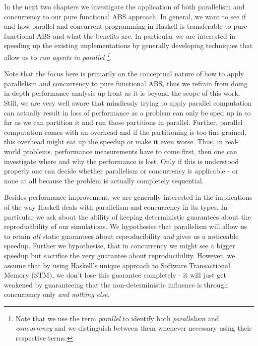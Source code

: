 In the next two chapters we investigate the application of both parallelism and concurrency to our pure functional ABS approach. In general, we want to see if and how parallel and concurrent programming in Haskell is transferable to pure functional ABS and what the benefits are. In particular we are interested in speeding up the existing implementations by generally developing techniques that allow us to  \textit{run agents in parallel \footnote{Note that we use the term \textit{parallel} to identify both \textit{parallelism} and \textit{concurrency} and we distinguish between them whenever necessary using their respective terms.}}. 

Note that the focus here is primarily on the conceptual nature of how to apply parallelism and concurrency to pure functional ABS, thus we refrain from doing in-depth performance analysis up-front as it is beyond the scope of this work. Still, we are very well aware that mindlessly trying to apply parallel computation can actually result in loss of performance as a problem can only be sped up in so far as we can partition it and run those partitions in parallel. Further, parallel computation comes with an overhead and if the partitioning is too fine-grained, this overhead might eat up the speedup or make it even worse. Thus, in real-world problems, performance measurements have to come first, then one can investigate where and why the performance is lost. Only if this is understood properly one can decide whether parallelism or concurrency is applicable - or none at all because the problem is actually completely sequential. %

Besides performance improvement, we are generally interested in the implications of the way Haskell deals with parallelism and concurrency in its types. In particular we ask about the ability of keeping deterministic guarantees about the reproducibility of our simulations. We hypothesise that parallelism will allow us to retain \textit{all} static guarantees about reproducibility \textit{and} gives us a noticeable speedup. Further we hypothesise, that in concurrency we might see a bigger speedup but sacrifice the very guarantee about reproducibility. However, we assume that by using Haskell's unique approach to Software Transactional Memory (STM), we don't lose this guarantee completely - it will just get weakened by guaranteeing that the non-deterministic influence is through concurrency only \textit{and nothing else}.



